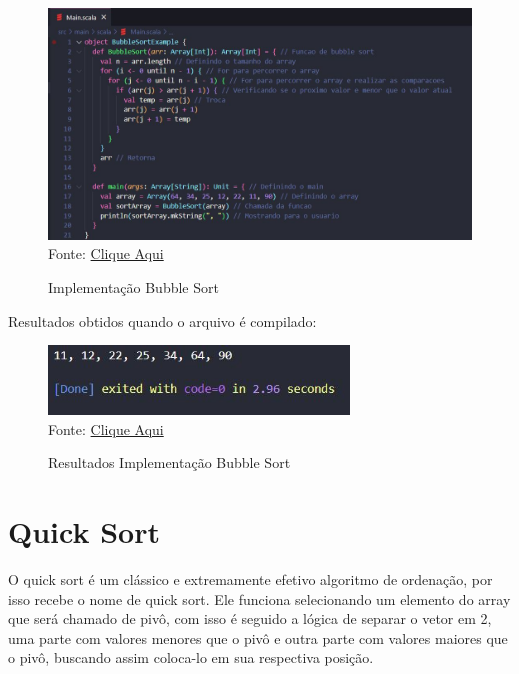 	\begin{figure}[H]
		\centering
		\caption{Implementação Bubble Sort}
		\label{Implementação Bubble Sort}
		\includegraphics[width=17cm]{Pictures/bubble.jpg} \\
		Fonte: \href{https://www.includehelp.com/scala/implement-an-arithmetic-calculator-using-a-match-case.aspx}{Clique Aqui}
	\end{figure}

	Resultados obtidos quando o arquivo é compilado:

	\begin{figure}[H]
		\centering
		\caption{Resultados Implementação Bubble Sort}
		\label{Resultados Implementação Bubble Sort}
		\includegraphics[width=8cm]{Pictures/resBubble.jpg} \\
		Fonte: \href{https://www.includehelp.com/scala/implement-an-arithmetic-calculator-using-a-match-case.aspx}{Clique Aqui}
	\end{figure}

    \section{Quick Sort}
    O quick sort é um clássico e extremamente efetivo algoritmo de ordenação, por isso recebe o nome de quick sort. Ele funciona selecionando um elemento do array que será chamado de pivô, com isso é seguido a lógica de separar o vetor em 2, uma parte com valores menores que o pivô e outra parte com valores maiores que o pivô, buscando assim coloca-lo em sua respectiva posição.
    
